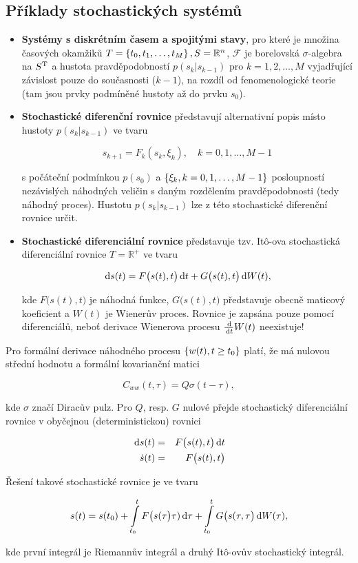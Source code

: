 \subsection{Příklady stochastických systémů}
\begin{itemize}
\item \textbf{Systémy s diskrétním časem a spojitými stavy}, pro které je množina časových okamžiků $T = \left\{t_0,t_1,\ldots, t_M\right\}, S=\mathbb{R}^n$, $\mathscr{F}$ je borelovská $\sigma$-algebra na $S^{\mathrm{T}}$ a hustota pravděpodobností $p(s_k|s_{k-1})$ pro $k=1,2,\ldots,M$ vyjadřující závislost pouze do současnosti ($k-1$), na rozdíl od fenomenologické teorie (tam jsou prvky podmíněné hustoty až do prvku $s_0$).

\item \textbf{Stochastické diferenční rovnice} představují alternativní popis místo hustoty $p(s_k|s_{k-1})$ ve tvaru

\[ s_{k+1}=F_k(s_k,\xi_k),\quad k=0,1,\ldots, M-1 \]

s počáteční podmínkou $p(s_0)$ a $\left\{\xi_k, k=0,1,\ldots,M-1\right\}$ posloupností nezávislých náhodných veličin s daným rozdělením pravděpodobnosti (tedy náhodný proces). Hustotu $p(s_k|s_{k-1})$ lze z této stochastické diferenční rovnice určit.

\item \textbf{Stochastické diferenciální rovnice} představuje tzv. Itô-ova stochastická diferenciální rovnice $T=\mathbb{R}^+$ ve tvaru

\[ \,\mathrm{d} s(t) = F\big(s(t),t\big)\,\mathrm{d} t + G\big(s(t),t\big)\,\mathrm{d} W(t), \]

kde $F\big(s(t),t\big)$ je náhodná funkce, $G\big(s(t),t\big)$ představuje obecně maticový koeficient a $W(t)$ je Wienerův proces. Rovnice je zapsána pouze pomocí diferenciálů, neboť derivace Wienerova procesu $\frac{\,\mathrm{d}}{\,\mathrm{d} t} W(t)$ neexistuje!
\end{itemize}

Pro formální derivace náhodného procesu $\left\{w(t), t\geq t_0\right\}$ platí, že má nulovou střední hodnotu a formální kovarianční matici

\[ C_{ww}(t,\tau)=Q\sigma(t-\tau), \]

kde $\sigma$ značí Diracův pulz. Pro $Q$, resp. $G$ nulové přejde stochastický diferenciální rovnice v obyčejnou (deterministickou) rovnici

\begin{eqnarray*}
\,\mathrm{d} s(t) & = & F\big(s(t),t\big)\,\mathrm{d} t\\
\dot{s}(t) & = & F\big(s(t),t\big)
\end{eqnarray*}

Řešení takové stochastické rovnice je ve tvaru

\[ 
s(t) = s(t_0) + \int\limits_{t_0}^t F\big(s(\tau\big)\tau)\,\mathrm{d}\tau + \int\limits_{t_0}^t G\big(s(\tau,\tau\big)\,\mathrm{d} W(\tau),
\]

kde první integrál je Riemannův integrál a druhý Itô-ovův stochastický integrál.